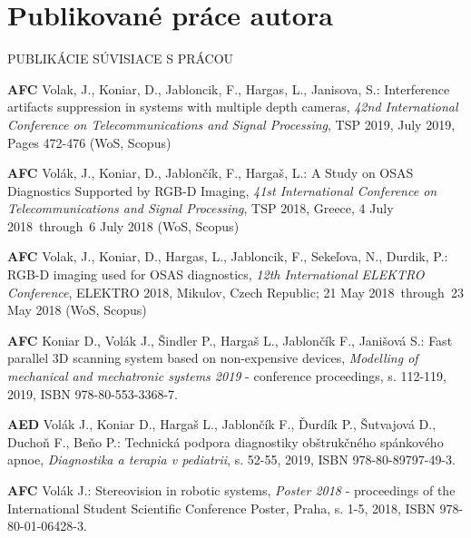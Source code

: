 \chapter{Publikované práce autora} 
\label{kap:Publikacie}

\pagestyle{fancy}
\fancyhf{}
\fancyfoot[CE,CO]{\thepage}
\renewcommand{\footrulewidth}{1pt}

\begin{center}
	\LARGE PUBLIKÁCIE SÚVISIACE S PRÁCOU
\end{center}


\noindent \textbf{AFC} Volak, J., Koniar, D., Jabloncik, F., Hargas, L., Janisova, S.: Interference artifacts suppression in systems with multiple depth cameras, \textit{42nd International Conference on Telecommunications and Signal Processing}, TSP 2019, July 2019, Pages 472-476 (WoS, Scopus) \newline

\noindent \textbf{AFC} Volák, J., Koniar, D., Jablončík, F., Hargaš, L.: A Study on OSAS Diagnostics Supported by RGB-D Imaging, \textit{41st International Conference on Telecommunications and Signal Processing}, TSP 2018, Greece, 4 July 2018 through 6 July 2018 (WoS, Scopus) \newline

\noindent \textbf{AFC} Volak, J., Koniar, D., Hargas, L., Jabloncik, F., Sekeľova, N., Durdik, P.: RGB-D imaging used for OSAS diagnostics, \textit{12th International ELEKTRO Conference}, ELEKTRO 2018, Mikulov, Czech Republic; 21 May 2018 through 23 May 2018 (WoS, Scopus) \newline

\noindent \textbf{AFC} Koniar D., Volák J., Šindler P., Hargaš L., Jablončík F., Janišová S.: Fast parallel 3D scanning system based on non-expensive devices, \textit{Modelling of mechanical and mechatronic systems 2019} - conference proceedings, s. 112-119, 2019, ISBN 978-80-553-3368-7. \newline

\noindent \textbf{AED} Volák J., Koniar D., Hargaš L., Jablončík F., Ďurdík P., Šutvajová D., Duchoň F., Beňo P.: Technická podpora diagnostiky obštrukčného spánkového apnoe, \textit{Diagnostika a terapia v pediatrii}, s. 52-55, 2019, ISBN 978-80-89797-49-3. \newpage

\noindent \textbf{AFC} Volák J.: Stereovision in robotic systems, \textit{Poster 2018} - proceedings of the International Student Scientific Conference Poster, Praha, s. 1-5, 2018, ISBN 978-80-01-06428-3. \newline

